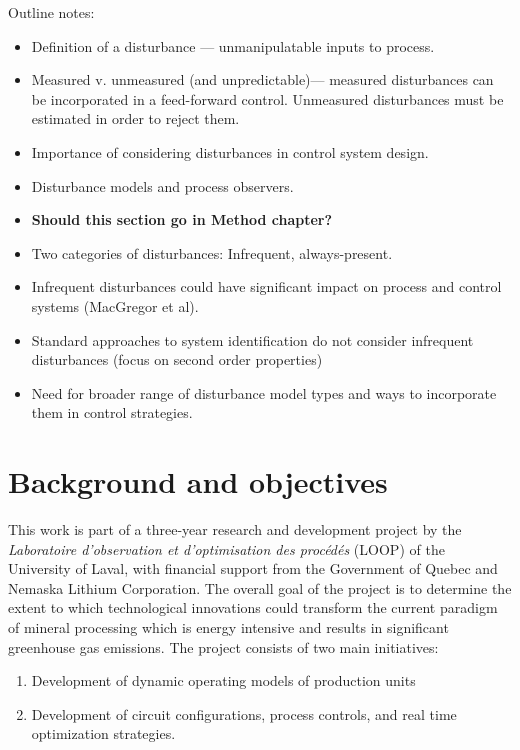 Outline notes:

\begin{itemize}
	\item Definition of a disturbance — unmanipulatable inputs to process.
	\item Measured v. unmeasured (and unpredictable)— measured disturbances can be incorporated in a feed-forward control.  Unmeasured disturbances must be estimated in order to reject them.
	\item Importance of considering disturbances in control system design.
	\item Disturbance models and process observers.
	\item \textbf{Should this section go in Method chapter?}
	\item Two categories of disturbances: Infrequent, always-present.
	\item Infrequent disturbances could have significant impact on process and control systems (MacGregor et al).
	\item Standard approaches to system identification do not consider infrequent disturbances (focus on second order properties)
	\item Need for broader range of disturbance model types and ways to incorporate them in control strategies.
\end{itemize}

\section*{Background and objectives}

This work is part of a three-year research and development project by the \textit{Laboratoire d’observation et d’optimisation des procédés} (LOOP) of the University of Laval, with financial support from the Government of Quebec and Nemaska Lithium Corporation. The overall goal of the project is to determine the extent to which technological innovations could transform the current paradigm of mineral processing which is energy intensive and results in significant greenhouse gas emissions. The project consists of two main initiatives:

\begin{enumerate}
	\item Development of dynamic operating models of production units
	\item Development of circuit configurations, process controls, and real time optimization strategies.
\end{enumerate}

